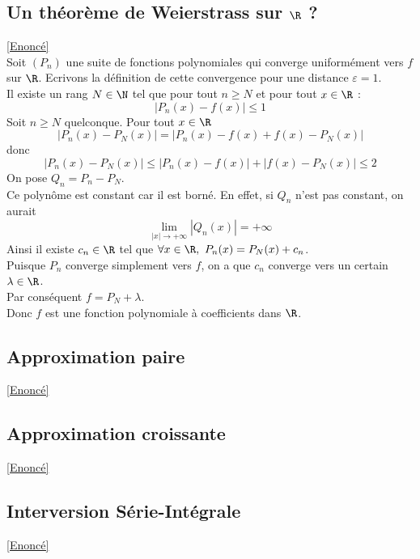 \documentclass{book}
\begin{document}
	\subsection{Un théorème de Weierstrass sur $\R$ ? }
	\label{Un théorème de Weierstrass sur R ? Corrigé}
	\textcolor{blue}{\hyperref[Un théorème de Weierstrass sur R ?]{[Enoncé]}}\\
	Soit $(P_n)$ une suite de fonctions polynomiales qui converge uniformément vers $f$ sur $\R$. Ecrivons la définition de cette convergence pour une distance $\varepsilon=1$.\\
	Il existe un rang $N\in\N$ tel que pour tout $n\geq N$ et pour tout $x\in\R$ :
	\[|P_n(x)-f(x)|\leq 1\]
	Soit $n\geq N$ quelconque. Pour tout $x\in \R$\\
	\[|P_n(x)-P_N(x)|=|P_n(x)-f(x)+f(x)-P_N(x)|\]
	donc \[|P_n(x)-P_N(x)|\leq |P_n(x)-f(x)|+|f(x)-P_N(x)|\leq 2\]
	On pose $Q_n=P_n-P_N$.\\
	Ce polynôme est constant car il est borné. En effet, si $Q_n$ n'est pas constant, on aurait \[\lim\limits_{|x|\to+\infty}|Q_n(x)|=+\infty\]
	Ainsi il existe $c_n\in\R$ tel que $\forall x\in \R,\ P_n(x)=P_N(x)+c_n$.\\
	Puisque $P_n$ converge simplement vers $f$, on a que $c_n$ converge vers un certain $\lambda\in\R$.\\
	Par conséquent $f=P_N+\lambda$.\\
	Donc $f$ est une fonction polynomiale à coefficients dans $\R$.
	
	\subsection{Approximation paire}
	\label{sec:approximation-paire}
	\textcolor{blue}{\hyperref[Approximation paire]{[Enoncé]}}\\
	
	\subsection{Approximation croissante}
	\label{sec:approximation-croissante}
	\textcolor{blue}{\hyperref[Approximation croissante]{[Enoncé]}}\\
	
	\subsection{Interversion Série-Intégrale}
	\label{sec:interversion-serie-integrale}
	\textcolor{blue}{\hyperref[Interversion Série-Intégrale]{[Enoncé]}}\\
	
\end{document}
